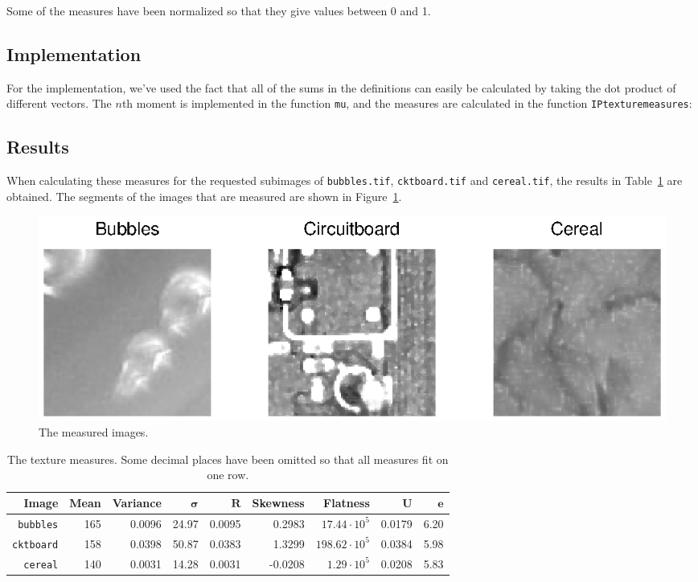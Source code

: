 Some of the measures have been normalized so that they give values between 0 and 1.

\subsection*{Implementation}
For the implementation, we've used the fact that all of the sums in the definitions can easily be calculated by taking the dot product of different vectors. The \(n\)th moment is implemented in the function \texttt{mu}, and the measures are calculated in the function \texttt{IPtexturemeasures}:

\subsection*{Results}
When calculating these measures for the requested subimages of \texttt{bubbles.tif}, \texttt{cktboard.tif} and \texttt{cereal.tif}, the results in Table~\ref{tab:measures} are obtained.
The segments of the images that are measured are shown in Figure~\ref{fig:measured_images}.

\begin{figure}[htb]
 \centering
 \includegraphics[width=\linewidth]{measured_images.eps}
 \caption{The measured images.}
 \label{fig:measured_images}
\end{figure}

\begin{table}[htb]
    \begin{tabular}{| r | r | r | r | r | r | r | r | r |}
	    \hline
	    \textbf{Image}    & \textbf{Mean} & \textbf{Variance} & \(\pmb{\sigma}\) & \(\mathbf{R}\) & \textbf{Skewness} & \textbf{Flatness}     & \(\mathbf{U}\) & \(\mathbf{e}\) \\ \hline
	    \texttt{bubbles}  & 165           & 0.0096            & 24.97            & 0.0095         &  0.2983           &  \(17.44 \cdot 10^5\) & 0.0179         & 6.20           \\
	    \texttt{cktboard} & 158           & 0.0398            & 50.87            & 0.0383         &  1.3299           & \(198.62 \cdot 10^5\) & 0.0384         & 5.98           \\
	    \texttt{cereal}   & 140           & 0.0031            & 14.28            & 0.0031         & -0.0208           &   \(1.29 \cdot 10^5\) & 0.0208         & 5.83           \\
	    \hline
    \end{tabular}
    \caption{The texture measures. Some decimal places have been omitted so that all measures fit on one row.}
    \label{tab:measures}
\end{table}

